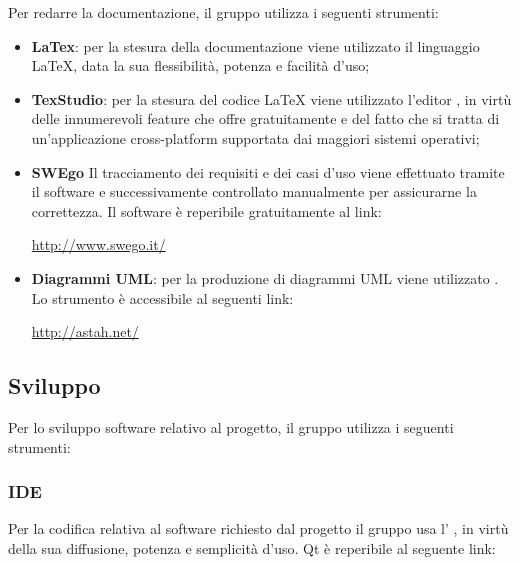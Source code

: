 \documentclass[../NormediProgetto.tex]{subfiles}
\begin{document}
	
	Per redarre la documentazione, il gruppo utilizza i seguenti strumenti:
	
	\begin{itemize}
		\item \textbf{LaTex}: per la stesura della documentazione viene utilizzato il linguaggio \LaTeX{}, data la sua flessibilità, potenza e facilità d'uso;
		
		\item \textbf{TexStudio}: per la stesura del codice \LaTeX{} viene utilizzato l’editor , in virtù delle innumerevoli feature che offre gratuitamente e del fatto che si tratta di un'applicazione cross-platform supportata dai maggiori sistemi operativi;
		
		\item \textbf{SWEgo} Il tracciamento dei requisiti e dei casi d'uso viene effettuato tramite il software  e successivamente controllato manualmente per assicurarne la correttezza. Il software è reperibile gratuitamente al link:
		\begin{center}
			\url{http://www.swego.it/}
		\end{center}
		
		\item \textbf{Diagrammi UML}: per la produzione di diagrammi UML viene utilizzato . Lo strumento è accessibile al seguenti link: 
		
		\begin{center}
			\centerline{\url{http://astah.net/}}
		\end{center}
			
	\end{itemize}


	\subsection{Sviluppo}

	Per lo sviluppo software relativo al progetto, il gruppo utilizza i seguenti strumenti:

	\subsubsection{IDE}

	Per la codifica relativa al software richiesto dal progetto il gruppo usa l' , in virtù della sua diffusione, potenza e semplicità d'uso. Qt è reperibile al seguente link:
	
\end{document}
